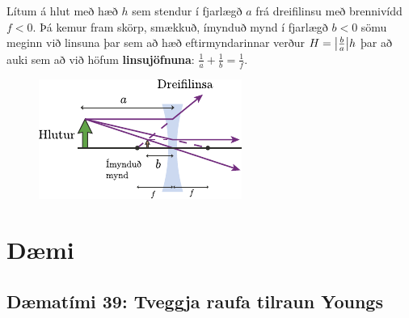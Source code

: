 \begin{tcolorbox}
\begin{theorem}
Lítum á hlut með hæð $h$ sem stendur í fjarlægð $a$ frá dreifilinsu með brennivídd $f < 0$. Þá kemur fram skörp, smækkuð, ímynduð mynd í fjarlægð $b < 0$ sömu meginn við linsuna þar sem að hæð eftirmyndarinnar verður $H = \abs{\frac{b}{a}}h$ þar að auki sem að við höfum \textbf{linsujöfnuna}: $ \frac{1}{a} + \frac{1}{b} = \frac{1}{f}$.

\begin{figure}[H]
    \centering
    \includegraphics{figures/dreifilinsa.pdf}
\end{figure}
\end{theorem}
\end{tcolorbox}

\newpage

\section{Dæmi}

\subsection*{Dæmatími 39: Tveggja raufa tilraun Youngs}

